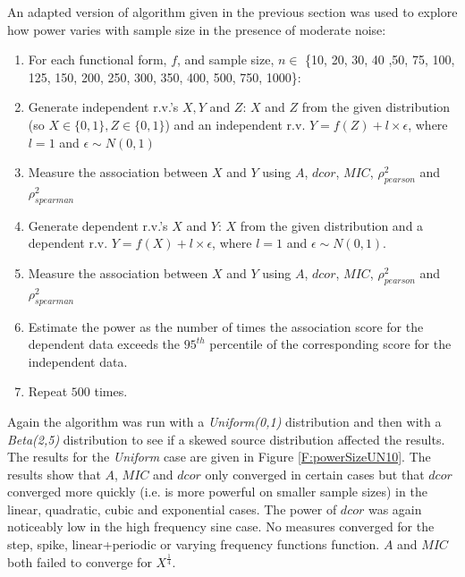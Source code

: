 \documentclass[a4paper, 12pt]{report}
\begin{document}
An adapted version of algorithm given in the previous section was used to explore how power varies with sample size in the presence of moderate noise:

\begin{enumerate}
\item For each functional form, $f$, and sample size, $n\in$ \{10, 20, 30, 40 ,50, 75, 100, 125, 150, 200, 250, 300, 350, 400, 500, 750, 1000\}:
\item Generate independent r.v.'s $X,Y$ and $Z$: $X$ and $Z$ from the given distribution (so $X \in \{0,1\}, Z \in \{0,1\}$) and an independent r.v. $Y=f(Z) + l \times \epsilon$, where $l=1$ and $\epsilon \sim N(0,1)$
\item  Measure the association between $X$ and $Y$ using $A$, $dcor$, $MIC$, $\rho_{pearson}^2$ and $\rho_{spearman}^2$
\item Generate dependent r.v.'s $X$ and $Y$: $X$ from the given distribution and a dependent r.v. $Y=f(X) + l \times \epsilon$, where $l=1$ and $\epsilon \sim N(0,1)$. 
\item  Measure the association between $X$ and $Y$ using $A$, $dcor$, $MIC$, $\rho_{pearson}^2$ and $\rho_{spearman}^2$
\item Estimate the power as the number of times the association score for the dependent data exceeds the $95^{th}$ percentile of the corresponding score for the independent data.
\item Repeat $500$ times.
\end{enumerate}

Again the algorithm was run with a \textit{Uniform(0,1)} distribution and then with a \textit{Beta(2,5)} distribution to see if a skewed source distribution affected the results. The results for the \textit{Uniform} case are given in Figure \ref{F:powerSizeUN10}. The results show that $A$, $MIC$ and $dcor$ only converged in certain cases but that $dcor$ converged more quickly (i.e. is more powerful on smaller sample sizes) in the linear, quadratic, cubic and exponential cases. The power of $dcor$ was again noticeably low in the high frequency sine case. No measures converged for the step, spike, linear+periodic or varying frequency functions function. $A$ and $MIC$ both failed to converge for $X^{\frac{1}{4}}$.

\end{document}
